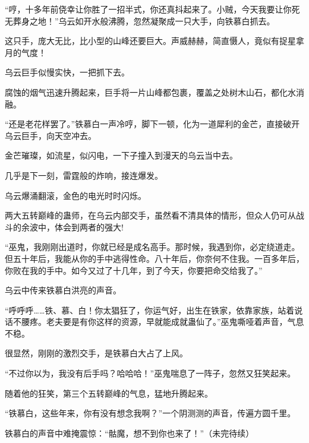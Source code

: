 \begin{this_body}
“哼，十多年前侥幸让你胜了一招半式，你还真抖起来了。小贼，今天我要让你死无葬身之地！”乌云如开水般沸腾，忽然凝聚成一只大手，向铁慕白抓去。

这只手，庞大无比，比小型的山峰还要巨大。声威赫赫，简直慑人，竟似有捉星拿月的气度！

乌云巨手似慢实快，一把抓下去。

腐蚀的烟气迅速升腾起来，巨手将一片山峰都包裹，覆盖之处树木山石，都化水消融。

“还是老花样罢了。”铁慕白一声冷哼，脚下一顿，化为一道犀利的金芒，直接破开乌云巨手，向天空冲去。

金芒璀璨，如流星，似闪电，一下子撞入到漫天的乌云当中去。

几乎是下一刻，雷霆般的炸响，接连爆发。

乌云爆涌翻滚，金色的电光时时闪烁。

两大五转巅峰的蛊师，在乌云内部交手，虽然看不清具体的情形，但众人仍可从战斗的余波中，体会到两者的强大!

“巫鬼，我刚刚出道时，你就已经是成名高手。那时候，我遇到你，必定绕道走。但五十年后，我能从你的手中逃得性命。八十年后，你奈何不住我。一百多年后，你败在我的手中。如今又过了十几年，到了今天，你要把命交给我了。”

乌云中传来铁慕白洪亮的声音。

“呼呼呼……铁、慕、白！你太猖狂了，你运气好，出生在铁家，依靠家族，站着说话不腰疼。老夫要是有你这样的资源，早就能成就蛊仙了。”巫鬼嘶哑着声音，气息不稳。

很显然，刚刚的激烈交手，是铁慕白大占了上风。

“不过你以为，我没有后手吗？哈哈哈！”巫鬼喘息了一阵子，忽然又狂笑起来。

随着他的狂笑，第三个五转巅峰的气息，猛地升腾起来。

“铁慕白，这些年来，你有没有想念我啊？”一个阴测测的声音，传遍方圆千里。

铁慕白的声音中难掩震惊：“骷魔，想不到你也来了！”（未完待续）

\end{this_body}

